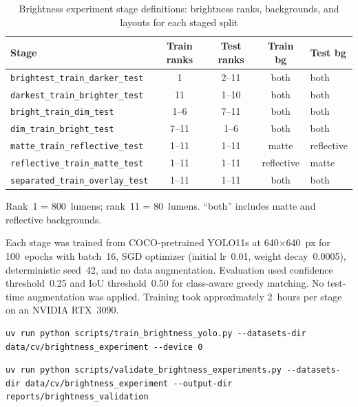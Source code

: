 \documentclass[10pt,a4paper]{article}
\begin{document}
\begin{table}[H]
\centering
\caption{Brightness experiment stage definitions: brightness ranks,
backgrounds, and layouts for each staged split}
\label{tab:app-stage-definitions}
\small\renewcommand{\arraystretch}{1.2}\setlength{\tabcolsep}{4pt}
\begin{tabularx}{\textwidth}{lcccl}
\hline
Stage & Train ranks & Test ranks & Train bg & Test bg \\
\hline
\texttt{brightest\_train\_darker\_test} & 1 & 2--11 & both & both \\
\texttt{darkest\_train\_brighter\_test} & 11 & 1--10 & both & both \\
\texttt{bright\_train\_dim\_test} & 1--6 & 7--11 & both & both \\
\texttt{dim\_train\_bright\_test} & 7--11 & 1--6 & both & both \\
\texttt{matte\_train\_reflective\_test} & 1--11 & 1--11 & matte & reflective \\
\texttt{reflective\_train\_matte\_test} & 1--11 & 1--11 & reflective & matte \\
\texttt{separated\_train\_overlay\_test} & 1--11 & 1--11 & both & both \\
\hline
\end{tabularx}
\vspace{2mm}
\noindent\small Rank~1 = 800~lumens; rank~11 = 80~lumens.
``both'' includes matte and reflective backgrounds.
\end{table}

Each stage was trained from COCO-pretrained YOLO11s at
640$\times$640~px for 100~epochs with batch~16, SGD optimizer
(initial lr~0.01, weight decay~0.0005), deterministic seed~42, and
no data augmentation. Evaluation used confidence threshold~0.25 and
IoU threshold~0.50 for class-aware greedy matching. No test-time
augmentation was applied. Training took approximately 2~hours per
stage on an NVIDIA RTX~3090.

\begin{lstlisting}[caption={Train all seven brightness stages},label=lst:train-brightness]
uv run python scripts/train_brightness_yolo.py --datasets-dir data/cv/brightness_experiment --device 0
\end{lstlisting}

\begin{lstlisting}[caption={Validate brightness stages and export per-image metrics},label=lst:validate-brightness]
uv run python scripts/validate_brightness_experiments.py --datasets-dir data/cv/brightness_experiment --output-dir reports/brightness_validation
\end{lstlisting}
\end{document}
